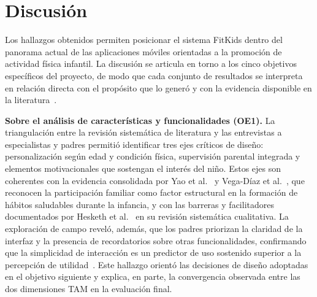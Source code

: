 		\section{Discusión}
		\label{sec:discusion}
			Los hallazgos obtenidos permiten posicionar el sistema FitKids dentro del panorama actual de las aplicaciones móviles orientadas a la promoción de actividad física infantil. La discusión se articula en torno a los cinco objetivos específicos del proyecto, de modo que cada conjunto de resultados se interpreta en relación directa con el propósito que lo generó y con la evidencia disponible en la literatura~\cite{GuerreroUlloa2024}.
			
			\textbf{Sobre el análisis de características y funcionalidades (OE1).} La triangulación entre la revisión sistemática de literatura y las entrevistas a especialistas y padres permitió identificar tres ejes críticos de diseño: personalización según edad y condición física, supervisión parental integrada y elementos motivacionales que sostengan el interés del niño. Estos ejes son coherentes con la evidencia consolidada por Yao et al.~\cite{Yao2015} y Vega-Díaz et al.~\cite{VegaDiaz2023}, que reconocen la participación familiar como factor estructural en la formación de hábitos saludables durante la infancia, y con las barreras y facilitadores documentados por Hesketh et al.~\cite{VegaDiaz2023} en su revisión sistemática cualitativa. La exploración de campo reveló, además, que los padres priorizan la claridad de la interfaz y la presencia de recordatorios sobre otras funcionalidades, confirmando que la simplicidad de interacción es un predictor de uso sostenido superior a la percepción de utilidad~\cite{Venkatesh2003}. Este hallazgo orientó las decisiones de diseño adoptadas en el objetivo siguiente y explica, en parte, la convergencia observada entre las dos dimensiones TAM en la evaluación final.
			
